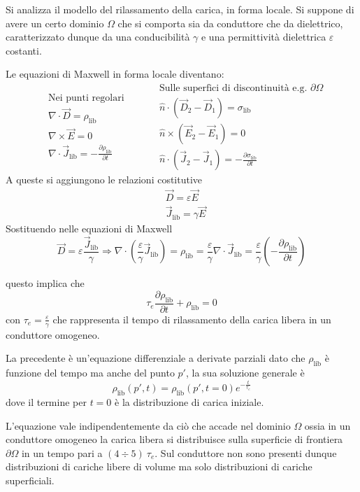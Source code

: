 Si analizza il modello del rilassamento della carica, in forma locale. Si suppone
di avere un certo dominio $\Omega$ che si comporta sia da conduttore che da dielettrico,
caratterizzato dunque da una conducibilità $\gamma$ e una permittività dielettrica
$\varepsilon$ costanti.

Le equazioni di Maxwell in forma locale diventano:
$$
\begin{aligned}
&\text{Nei punti regolari}\\
&\nabla\cdot\vec{D} = \rho_\text{lib} \\
&\nabla\times\vec{E} = 0\\
&\nabla\cdot\vec{J}_\text{lib} = -\frac{\partial \rho_\text{lib}}{\partial t}
\end{aligned}\qquad 
\begin{aligned}
&\text{Sulle superfici di discontinuità e.g. }\partial \Omega\\
&\hat{n}\cdot\left(\vec{D}_2-\vec{D}_1\right) = \sigma_\text{lib}\\
&\hat{n}\times\left(\vec{E}_2-\vec{E}_1\right) = 0\\
&\hat{n}\cdot\left(\vec{J}_2-\vec{J}_1\right) = -\frac{\partial\sigma_\text{lib}}{\partial t}
\end{aligned}
$$
A queste si aggiungono le relazioni costitutive
$$
\begin{aligned}
&\vec{D} = \varepsilon\vec{E}\\
&\vec{J}_\text{lib} = \gamma \vec{E}
\end{aligned}
$$
Sostituendo nelle equazioni di Maxwell
$$
\vec{D} = \varepsilon\frac{\vec{J}_\text{lib}}{\gamma} \Rightarrow \nabla\cdot\left(\frac{\varepsilon}{\gamma}\vec{J}_\text{lib}\right) = \rho_\text{lib}=
\frac{\varepsilon}{\gamma}\nabla\cdot\vec{J}_\text{lib} = \frac{\varepsilon}{\gamma}\left(-\frac{\partial \rho_\text{lib}}{\partial t}\right)
$$

questo implica che 
$$
\tau_e \frac{\partial\rho_\text{lib}}{\partial t} + \rho_\text{lib} = 0
$$
con $\tau_e = \frac{\varepsilon}{\gamma}$ che rappresenta il tempo di rilassamento della
carica libera in un conduttore omogeneo.

La precedente è un'equazione differenziale a derivate parziali dato che $\rho_\text{lib}$
è funzione del tempo ma anche del punto $p'$, la sua soluzione generale è
$$
\rho_\text{lib}(p',t) = \rho_\text{lib}(p',t=0)e^{-\frac{t}{\tau_e}}
$$
dove il termine per $t=0$ è la distribuzione di carica iniziale.

L'equazione vale indipendentemente da ciò che accade nel dominio $\Omega$ ossia in un 
conduttore omogeneo la carica libera si distribuisce sulla superficie di frontiera $\partial\Omega$ in un tempo pari a $(4\div 5)\ \tau_e$.
Sul conduttore non sono presenti dunque distribuzioni di cariche libere di volume ma 
solo distribuzioni di cariche superficiali.

